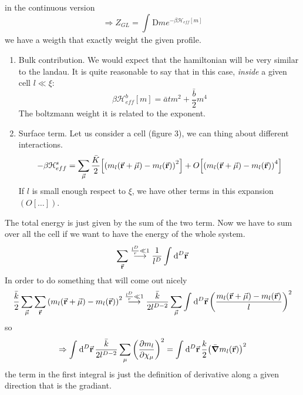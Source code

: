 \documentclass[../main/main.tex]{subfiles}
\begin{document}
in the continuous version
\begin{equation}
  \Rightarrow Z_{GL} = \int_{}^{} \text{D}  m e^{-\beta \mathcal{H}_{eff}[m]}
\end{equation}
we have a weigth that exactly weight the given profile.
\begin{enumerate}
\item Bulk contribution. We would expect that the hamiltonian will be very similar to the landau. It is quite reasonable to say that in this case, \emph{inside}  a given cell \( l \ll \xi  \):
\begin{equation}
  \beta \mathcal{H}_{eff}^b [m] = \bar{a} t m^2 + \frac{\bar{b} }{2} m^4
\end{equation}
The boltzmann weight it is related to the exponent.
\item Surface term. Let us consider a cell (figure 3), we can thing about different interactions.
\begin{equation}
  - \beta \mathcal{H}_{eff}^s =   \sum_{\va{\mu }}^{}  \frac{\bar{K} }{2}\qty[ \qty(m_l (\va{r}+\va{\mu }) - m_l(\va{r}))^2] + O \qty[ \qty(m_l (\va{r}+\va{\mu }) - m_l(\va{r}))^4 ]
 \end{equation}
 If \( l \) is small enough respect to \( \xi  \), we have other terms in this expansion \( (O[\dots]) \).
\end{enumerate}
The total energy is just given by the sum of the two term. Now we have to sum over all the cell if we want to have the energy of the whole system.
\begin{equation}
  \sum_{\va{r}}^{}  \overset{\frac{l^D}{r} \ll 1}{\longrightarrow}   \frac{1}{l^D} \int_{}^{} \dd[D]{\va{r}}
\end{equation}
In order to do something that will come out nicely
\begin{equation}
\frac{\bar{k} }{2} \sum_{\va{\mu }}^{} \sum_{\va{r}}^{}   \qty(m_l (\va{r}+\va{\mu }) - m_l(\va{r}))^2 \overset{\frac{l^D}{r} \ll 1}{\longrightarrow} \frac{\bar{k} }{2l^{D-2}} \sum_{\va{\mu }}^{} \int_{}^{} \dd[D]{\va{r}} \qty(\frac{m_l (\va{r}+\va{\mu }) - m_l(\va{r})}{l})^2
\end{equation}
so
\begin{equation}
  \Rightarrow \int_{}^{} \dd[D]{\va{r}}  \frac{\bar{k} }{2l^{D-2}} \sum_{\mu }^{} \qty(\pdv{m_l}{\chi _ \mu } )^2 = \int_{}^{} \dd[D]{\va{r}} \frac{k}{2} \qty(\bar{\grad } m_l (\va{r}) )^2
\end{equation}
the term in the first integral is just the definition of derivative along a given direction that is the gradiant.
\end{document}
